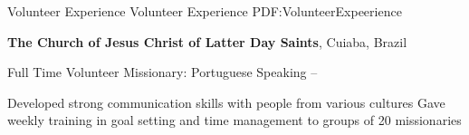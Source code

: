 \documentclass[letterpaper,MMMyyyy,nonstopmode]{simpleresumecv}
\begin{document}
\begin{Body}

\Section
{Volunteer Experience}
{Volunteer Experience}
{PDF:VolunteerExpeerience}

\Gap
\Entry
\textbf{The Church of Jesus Christ of Latter Day Saints},
Cuiaba, Brazil

\Gap
\BulletItem
Full Time Volunteer Missionary: Portuguese Speaking
\hfill
{}--
\begin{Detail}
\SubBulletItem
Developed strong communication skills with people from various cultures
\SubBulletItem
Gave weekly training in goal setting and time management to groups of 20 missionaries
\end{Detail}

\end{Body}

\thispagestyle{empty}
\end{document}
